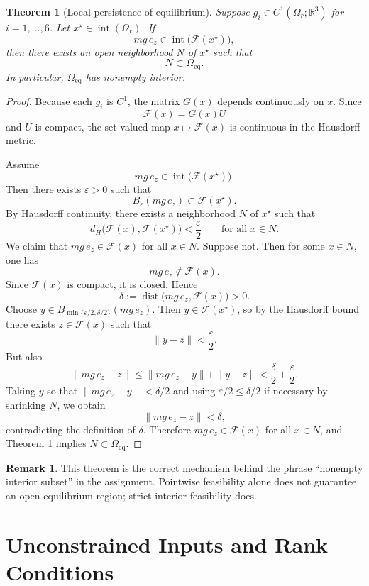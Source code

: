 \documentclass[11pt]{article}
\newtheorem{theorem}{Theorem}
\theoremstyle{definition}
\newtheorem{remark}{Remark}
\begin{document}
\begin{theorem}[Local persistence of equilibrium]
Suppose \(g_i \in C^1(\Omega_r;\mathbb{R}^3)\) for \(i=1,\dots,6\). Let \(x^\star \in \operatorname{int}(\Omega_r)\). If
\[
mg\,e_z \in \operatorname{int}\big(\mathcal{F}(x^\star)\big),
\]
then there exists an open neighborhood \(N\) of \(x^\star\) such that
\[
N \subset \Omega_{\mathrm{eq}}.
\]
In particular, \(\Omega_{\mathrm{eq}}\) has nonempty interior.
\end{theorem}

\begin{proof}
Because each \(g_i\) is \(C^1\), the matrix \(G(x)\) depends continuously on \(x\). Since
\[
\mathcal{F}(x)=G(x)U
\]
and \(U\) is compact, the set-valued map \(x\mapsto \mathcal{F}(x)\) is continuous in the Hausdorff metric.

Assume
\[
mg\,e_z \in \operatorname{int}\big(\mathcal{F}(x^\star)\big).
\]
Then there exists \(\varepsilon>0\) such that
\[
B_\varepsilon(mg\,e_z)\subset \mathcal{F}(x^\star).
\]
By Hausdorff continuity, there exists a neighborhood \(N\) of \(x^\star\) such that
\[
d_H\big(\mathcal{F}(x),\mathcal{F}(x^\star)\big)<\frac{\varepsilon}{2}
\qquad \text{for all } x\in N.
\]
We claim that \(mg\,e_z \in \mathcal{F}(x)\) for all \(x\in N\). Suppose not. Then for some \(x\in N\), one has
\[
mg\,e_z \notin \mathcal{F}(x).
\]
Since \(\mathcal{F}(x)\) is compact, it is closed. Hence
\[
\delta:=\operatorname{dist}\big(mg\,e_z,\mathcal{F}(x)\big)>0.
\]
Choose \(y\in B_{\min\{\varepsilon/2,\delta/2\}}(mg\,e_z)\). Then \(y\in \mathcal{F}(x^\star)\), so by the Hausdorff bound there exists \(z\in \mathcal{F}(x)\) such that
\[
\|y-z\|<\frac{\varepsilon}{2}.
\]
But also
\[
\|mg\,e_z-z\|\le \|mg\,e_z-y\|+\|y-z\|<\frac{\delta}{2}+\frac{\varepsilon}{2}.
\]
Taking \(y\) so that \(\|mg\,e_z-y\|<\delta/2\) and using \(\varepsilon/2\le \delta/2\) if necessary by shrinking \(N\), we obtain
\[
\|mg\,e_z-z\|<\delta,
\]
contradicting the definition of \(\delta\). Therefore \(mg\,e_z\in \mathcal{F}(x)\) for all \(x\in N\), and Theorem 1 implies \(N\subset \Omega_{\mathrm{eq}}\).
\end{proof}

\begin{remark}
This theorem is the correct mechanism behind the phrase ``nonempty interior subset'' in the assignment. Pointwise feasibility alone does not guarantee an open equilibrium region; strict interior feasibility does.
\end{remark}

\section{Unconstrained Inputs and Rank Conditions}
\end{document}
